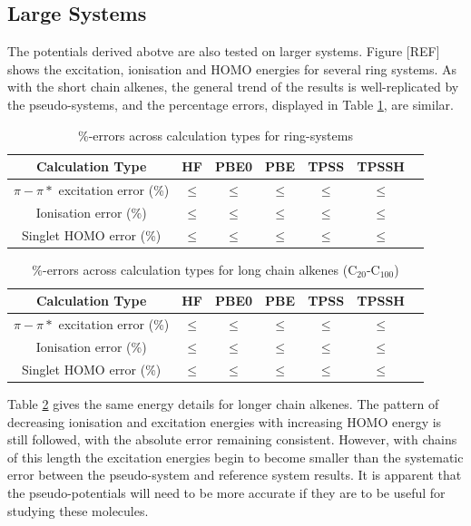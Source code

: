 \documentclass[journal=jctcce,manuscript=article]{achemso}
\begin{document}
\subsection{Large Systems}

The potentials derived abotve are also tested on larger systems. Figure [REF] shows the excitation, ionisation and HOMO energies for several ring systems. As with the short chain alkenes, the general trend of the results is well-replicated by the pseudo-systems, and the percentage errors, displayed in Table \ref{table:ring_system_errors}, are similar. 

\begin{table}[ht]
\caption{\%-errors across calculation types for ring-systems}
\begin{tabular}{c c c c c c c}
\hline\hline
Calculation Type & HF & PBE0 & PBE & TPSS & TPSSH \\
\hline
\(\pi - \pi*\) excitation error (\%) & \(\leq\)  &\(\leq\) & \(\leq\)  & \(\leq\)  & \(\leq\)  \\
Ionisation error (\%) & \(\leq\)  & \(\leq\)  & \(\leq\)  & \(\leq\)  & \(\leq\)  \\
Singlet HOMO error (\%) & \(\leq\)  & \(\leq\)  & \(\leq\)  & \(\leq\)  & \(\leq\) \\
\hline
\end{tabular}
\label{table:ring_system_errors}
\end{table}

\begin{table}[ht]
\caption{\%-errors across calculation types for long chain alkenes (C\(_{20}\)-C\(_{100}\))}
\begin{tabular}{c c c c c c c}
\hline\hline
Calculation Type & HF & PBE0 & PBE & TPSS & TPSSH \\
\hline
\(\pi - \pi*\) excitation error (\%) & \(\leq\)  &\(\leq\) & \(\leq\)  & \(\leq\)  & \(\leq\)  \\
Ionisation error (\%) & \(\leq\)  & \(\leq\)  & \(\leq\)  & \(\leq\)  & \(\leq\)  \\
Singlet HOMO error (\%) & \(\leq\)  & \(\leq\)  & \(\leq\)  & \(\leq\)  & \(\leq\) \\
\hline
\end{tabular}
\label{table:long_alkene_errors}
\end{table}

Table \ref{table:long_alkene_errors} gives the same energy details for longer chain alkenes. The pattern of decreasing ionisation and excitation energies with increasing HOMO energy is still followed, with the absolute error remaining consistent. However, with chains of this length the excitation energies begin to become smaller than the systematic error between the pseudo-system and reference system results. It is apparent that the pseudo-potentials will need to be more accurate if they are to be useful for studying these molecules.
\end{document}
